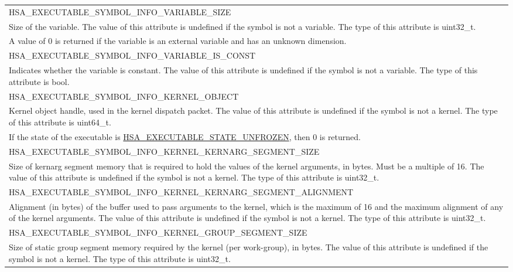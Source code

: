 \documentclass[final,oneside]{book}
\newcommand{\reftyp}[1]{#1}
\newcommand{\refenu}[1]{\reftyp{#1}}
\begin{document}
\begin{longtable}{@{\hspace{2em}}p{\linewidth-2em}}
\hspace{-2em}\refenu{HSA_\-EXECUTABLE_\-SYMBOL_\-INFO_\-VARIABLE_\-SIZE}\\Size of the variable. The value of this attribute is undefined if the symbol is not a variable. The type of this attribute is uint32_\-t.\\[2mm]
A value of 0 is returned if the variable is an external variable and has an unknown dimension.\\[2mm]
\hspace{-2em}\refenu{HSA_\-EXECUTABLE_\-SYMBOL_\-INFO_\-VARIABLE_\-IS_\-CONST}\\Indicates whether the variable is constant. The value of this attribute is undefined if the symbol is not a variable. The type of this attribute is bool.\\[2mm]
\hspace{-2em}\refenu{HSA_\-EXECUTABLE_\-SYMBOL_\-INFO_\-KERNEL_\-OBJECT}\\Kernel object handle, used in the kernel dispatch packet. The value of this attribute is undefined if the symbol is not a kernel. The type of this attribute is uint64_\-t.\\[2mm]
If the state of the executable is \hyperlink{group__executable_1ggaf31d2c00b44ef657f22fb12c21d7d352a7e851acbcb9d548bd22707efd59df201}{HSA_\-EXECUTABLE_\-STATE_\-UNFROZEN}, then 0 is returned.\\[2mm]
\hspace{-2em}\refenu{HSA_\-EXECUTABLE_\-SYMBOL_\-INFO_\-KERNEL_\-KERNARG_\-SEGMENT_\-SIZE}\\Size of kernarg segment memory that is required to hold the values of the kernel arguments, in bytes. Must be a multiple of 16. The value of this attribute is undefined if the symbol is not a kernel. The type of this attribute is uint32_\-t.\\[2mm]
\hspace{-2em}\refenu{HSA_\-EXECUTABLE_\-SYMBOL_\-INFO_\-KERNEL_\-KERNARG_\-SEGMENT_\-ALIGNMENT}\\Alignment (in bytes) of the buffer used to pass arguments to the kernel, which is the maximum of 16 and the maximum alignment of any of the kernel arguments. The value of this attribute is undefined if the symbol is not a kernel. The type of this attribute is uint32_\-t.\\[2mm]
\hspace{-2em}\refenu{HSA_\-EXECUTABLE_\-SYMBOL_\-INFO_\-KERNEL_\-GROUP_\-SEGMENT_\-SIZE}\\Size of static group segment memory required by the kernel (per work-group), in bytes. The value of this attribute is undefined if the symbol is not a kernel. The type of this attribute is uint32_\-t.\\[2mm]

\end{longtable}
\end{document}
